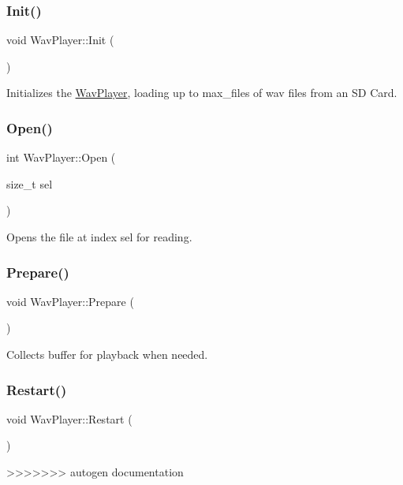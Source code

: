 \subsubsection{\texorpdfstring{Init()}{Init()}}
{\footnotesize\ttfamily void Wav\+Player\+::\+Init (\begin{DoxyParamCaption}{ }\end{DoxyParamCaption})}

Initializes the \hyperlink{classdaisy_1_1_wav_player}{Wav\+Player}, loading up to max\+\_\+files of wav files from an SD Card. \mbox{\label{classdaisy_1_1_wav_player_aa1161ed7b1e16a869d4b5dee293bead6}} 
\subsubsection{\texorpdfstring{Open()}{Open()}}
{\footnotesize\ttfamily int Wav\+Player\+::\+Open (\begin{DoxyParamCaption}\item[{size\+\_\+t}]{sel }\end{DoxyParamCaption})}

Opens the file at index sel for reading. \mbox{\label{classdaisy_1_1_wav_player_adafd33db85b1ded4299d173f2abba06e}} 
\subsubsection{\texorpdfstring{Prepare()}{Prepare()}}
{\footnotesize\ttfamily void Wav\+Player\+::\+Prepare (\begin{DoxyParamCaption}{ }\end{DoxyParamCaption})}

Collects buffer for playback when needed. \mbox{\label{classdaisy_1_1_wav_player_ad2f5ebf3afe73de518fd9d3853672261}} 
\subsubsection{\texorpdfstring{Restart()}{Restart()}}
{\footnotesize\ttfamily void Wav\+Player\+::\+Restart (\begin{DoxyParamCaption}{ }\end{DoxyParamCaption})}
>>>>>>> autogen documentation

